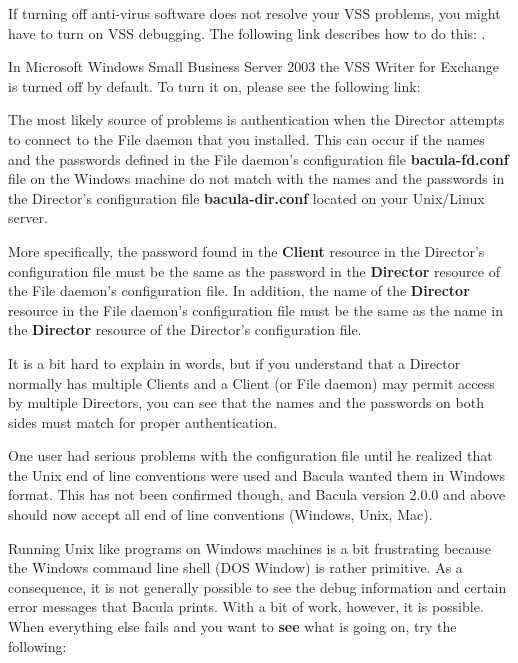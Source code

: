 If turning off anti-virus software does not resolve your VSS
problems, you might have to turn on VSS debugging.  The following
link describes how to do this:
.

In Microsoft Windows Small Business Server 2003 the VSS Writer for Exchange
is turned off by default. To turn it on, please see the following link:


The most likely source of problems is authentication when the Director
attempts to connect to the File daemon that you installed. This can occur if
the names and the passwords defined in the File daemon's configuration file
{\bf bacula-fd.conf} file on
the Windows machine do not match with the names and the passwords in the
Director's configuration file {\bf bacula-dir.conf} located on your Unix/Linux
server. 

More specifically, the password found in the {\bf Client} resource in the
Director's configuration file must be the same as the password in the {\bf
Director} resource of the File daemon's configuration file. In addition, the
name of the {\bf Director} resource in the File daemon's configuration file
must be the same as the name in the {\bf Director} resource of the Director's
configuration file. 

It is a bit hard to explain in words, but if you understand that a Director
normally has multiple Clients and a Client (or File daemon) may permit access
by multiple Directors, you can see that the names and the passwords on both
sides must match for proper authentication. 

One user had serious problems with the configuration file until he realized
that the Unix end of line conventions were used and Bacula wanted them in
Windows format. This has not been confirmed though, and Bacula version 2.0.0 
and above should now accept all end of line conventions (Windows,
Unix, Mac).

Running Unix like programs on Windows machines is a bit frustrating because
the Windows command line shell (DOS Window) is rather primitive. As a
consequence, it is not generally possible to see the debug information and
certain error messages that Bacula prints. With a bit of work, however, it is
possible. When everything else fails and you want to {\bf see} what is going
on, try the following: 

